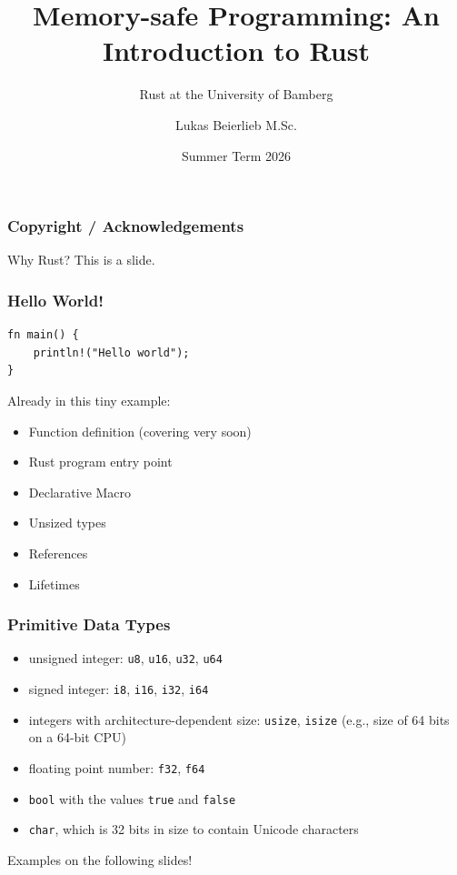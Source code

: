 \documentclass[aspectratio=169]{beamer}
\title{Memory-safe Programming: An Introduction to Rust}
\subtitle{Rust at the University of Bamberg}
\author{Lukas Beierlieb M.Sc.}
\date{Summer Term 2026}
\begin{document}
\frame[plain]{\titlepage}

\begin{frame}[fragile]
    \frametitle{Copyright / Acknowledgements}

\end{frame}

\begin{frame}{Why Rust?}
    This is a slide.
\end{frame}

\begin{frame}[fragile]
    \frametitle{Hello World!}
    \begin{verbatim}
fn main() {
    println!("Hello world");
}
    \end{verbatim}

    \pause

    Already in this tiny example:
    \begin{itemize}
        \pause
        \item Function definition (covering very soon)
        \item Rust program entry point
        \pause
        \item Declarative Macro
        \pause
        \item Unsized types
        \item References
        \item Lifetimes
    \end{itemize}
\end{frame}

\begin{frame}[fragile]
    \frametitle{Primitive Data Types}
    \begin{itemize}
        \item unsigned integer: \texttt{u8}, \texttt{u16}, \texttt{u32}, \texttt{u64}
        \item signed integer: \texttt{i8}, \texttt{i16}, \texttt{i32}, \texttt{i64}
        \item integers with architecture-dependent size: \texttt{usize}, \texttt{isize} (e.g., size of 64 bits on a 64-bit CPU)
        \pause
        \item floating point number: \texttt{f32}, \texttt{f64}
        \item \texttt{bool} with the values \texttt{true} and \texttt{false}
        \item \texttt{char}, which is 32 bits in size to contain Unicode characters
    \end{itemize}
    \pause
    Examples on the following slides!
\end{frame}
\end{document}
